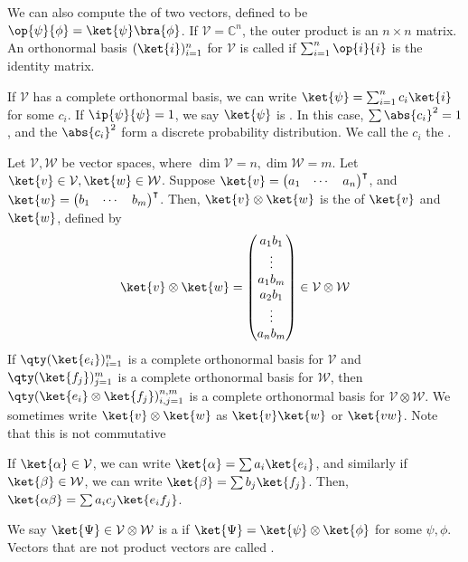 We can also compute the  of two vectors, defined to be $\op{\psi}{\phi} = \ket{\psi} \bra{\phi}$.
If $\mathcal V = \mathbb C^n$, the outer product is an $n \times n$ matrix.
An orthonormal basis $(\ket{i})_{i=1}^n$ for $\mathcal V$ is called  if $\sum_{i=1}^n \op{i}{i}$ is the identity matrix.

If $\mathcal V$ has a complete orthonormal basis, we can write $\ket{\psi} = \sum_{i=1}^n c_i \ket{i}$ for some $c_i$.
If $\ip{\psi}{\psi} = 1$, we say $\ket{\psi}$ is .
In this case, $\sum \abs{c_i}^2 = 1$, and the $\abs{c_i}^2$ form a discrete probability distribution.
We call the $c_i$ the .

Let $\mathcal V, \mathcal W$ be vector spaces, where $\dim \mathcal V = n, \dim \mathcal W = m$.
Let $\ket{v} \in \mathcal V, \ket{w} \in \mathcal W$.
Suppose $\ket{v} = \begin{pmatrix}
    a_1 & \cdots & a_n
\end{pmatrix}^\transpose$, and $\ket{w} = \begin{pmatrix}
    b_1 & \cdots & b_m
\end{pmatrix}^\transpose$.
Then, $\ket{v} \otimes \ket{w}$ is the  of $\ket{v}$ and $\ket{w}$, defined by
\[ \ket{v} \otimes \ket{w} = \begin{pmatrix}
    a_1 b_1 \\
    \vdots \\
    a_1 b_m \\
    a_2 b_1 \\
    \vdots \\
    a_n b_m
\end{pmatrix} \in \mathcal V \otimes \mathcal W \]
If $\qty(\ket{e_i})_{i=1}^n$ is a complete orthonormal basis for $\mathcal V$ and $\qty(\ket{f_j})_{j=1}^m$ is a complete orthonormal basis for $\mathcal W$, then $\qty(\ket{e_i} \otimes \ket{f_j})_{i,j=1}^{n,m}$ is a complete orthonormal basis for $\mathcal V \otimes \mathcal W$.
We sometimes write $\ket{v} \otimes \ket{w}$ as $\ket{v} \ket{w}$ or $\ket{vw}$.
Note that this is not commutative

If $\ket{\alpha} \in \mathcal V$, we can write $\ket{\alpha} = \sum a_i \ket{e_i}$, and similarly if $\ket{\beta} \in \mathcal W$, we can write $\ket{\beta} = \sum b_j \ket{f_j}$.
Then, $\ket{\alpha\beta} = \sum a_i c_j \ket{e_i f_j}$.

We say $\ket{\Psi} \in \mathcal V \otimes \mathcal W$ is a  if $\ket{\Psi} = \ket{\psi}\otimes\ket{\phi}$ for some $\psi, \phi$.
Vectors that are not product vectors are called .

